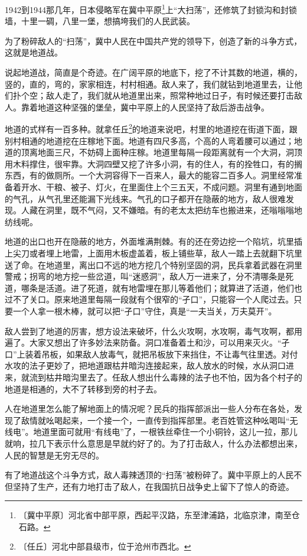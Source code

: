 \documentclass[12pt,UTF-8,openany]{ctexbook}
\begin{document}
\begin{Large}
    
    1942到1944那几年，日本侵略军在冀中平原\footnote{〔冀中平原〕河北省中部平原，西起平汉路，东至津浦路，北临京津，南至仓石路。}上“大扫荡”，还修筑了封锁沟和封锁墙，十里一碉，八里一堡，想搞垮我们的人民武装。
    
    为了粉碎敌人的“扫荡”，冀中人民在中国共产党的领导下，创造了新的斗争方式，这就是地道战。
    
    说起地道战，简直是个奇迹。在广阔平原的地底下，挖了不计其数的地道，横的，竖的，直的，弯的，家家相连，村村相通。敌人来了，我们就钻到地道里去，让他们扑个空；敌人走了，我们就从地道里出来，照常种地过日子，有时候还要打击敌人。靠着地道这种坚强的堡垒，冀中平原上的人民坚持了敌后游击战争。
    
    地道的式样有一百多种。就拿任丘\footnote{〔任丘〕河北中部县级市，位于沧州市西北。}的地道来说吧，村里的地道挖在街道下面，跟别村相通的地道挖在庄稼地下面。地道有四尺多高，个高的人弯着腰可以通过；地道的顶离地面三尺，不妨碍上面种庄稼。地道里每隔一段距离就有一个大洞，洞顶用木料撑住，很牢靠。大洞四壁又挖了许多小洞，有的住人，有的拴牲口，有的搁东西，有的做厕所。一个大洞容得下一百来人，最大的能容二百多人。洞里经常准备着开水、干粮、被子、灯火，在里面住上个三五天，不成问题。洞里有通到地面的气孔，从气孔里还能漏下光线来。气孔的口子都开在隐蔽的地方，敌人很难发现。人藏在洞里，既不气闷，又不嫌暗。有的老太太把纺车也搬进来，还嗡嗡嗡地纺线呢。
    
    地道的出口也开在隐蔽的地方，外面堆满荆棘。有的还在旁边挖一个陷坑，坑里插上尖刀或者埋上地雷，上面用木板虚盖着，板上铺些草，敌人一踏上去就翻下坑里送了命。在地道里，离出口不远的地方挖几个特别坚固的洞，民兵拿着武器在洞里警戒；拐弯的地方挖一些岔道，叫“迷惑洞”，敌人万一进来了，分不清哪条是死道，哪条是活道。进了死道，就有地雷埋在那儿等着他们；就算进了活道，他们也过不了关口。原来地道里每隔一段就有个很窄的“孑口”，只能容一个人爬过去。只要一个人拿一根木棒，就可以把“孑口”守住，真是“一夫当关，万夫莫开”。
    
    敌人尝到了地道的厉害，想方设法来破坏，什么火攻啊，水攻啊，毒气攻啊，都用遍了。大家又想出了许多妙法来防备。洞口准备着土和沙，可以用来灭火。“孑口”上装着吊板，如果敌人放毒气，就把吊板放下来挡住，不让毒气往里透。对付水攻的法子更妙了，把地道跟枯井暗沟连接起来，敌人放水的时候，水从洞口进来，就流到枯井暗沟里去了。任敌人想出什么毒辣的法子也不怕，因为各个村子的地道是相通的，大不了转移到旁的村子去。
    
    人在地道里怎么能了解地面上的情况呢？民兵的指挥部派出一些人分布在各处，发现了敌情就吆喝起来，一个接一个，一直传到指挥部里。老百姓管这种吆喝叫“无线电”。地道里面可就用“有线电”了，一根铁丝牵住一个小铜铃，这儿一拉，那儿就响，拉几下表示什么意思是早就约好了的。为了打击敌人，什么办法都想出来，人民的智慧是无穷无尽的。
    
    有了地道战这个斗争方式，敌人毒辣透顶的“扫荡”被粉碎了。冀中平原上的人民不但坚持了生产，还有力地打击了敌人，在我国抗日战争史上留下了惊人的奇迹。
    
\end{Large}
\end{document}
